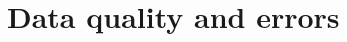 

\ifpdf
\graphicspath{{Appendix1/Figs/Raster/}{Appendix1/Figs/PDF/}{Appendix1/Figs/}}
\else
\graphicspath{{Appendix1/Figs/Vector/}{Appendix1/Figs/}}
\fi



\chapter{Data quality and errors} 



